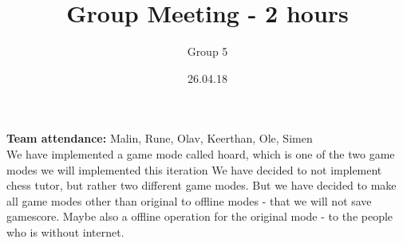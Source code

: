 \documentclass{article}
\title{Group Meeting - 2 hours}
\author{Group 5}
\date{26.04.18}
\begin{document}
	\maketitle
	\noindent
	\textbf{Team attendance:}  Malin, Rune, Olav, Keerthan, Ole, Simen \\
  \noindent
	We have implemented a game mode called hoard, which is one of the two game modes we will implemented this iteration
	We have decided to not implement chess tutor, but rather two different game modes. But we have decided to
	make all game modes other than original to offline modes - that we will not save gamescore. Maybe also a offline operation
	for the original mode - to the people who is without internet.
\end{document}
